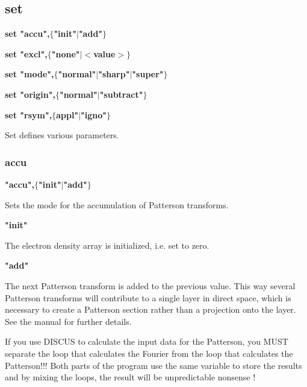 \subsection*{set}
{\bf set "accu",$ \{$"init"$| $"add"$\} $ \par }
{\bf set "excl",$ \{$"none"$| $$ <$value$> $$\} $ \par }
{\bf set "mode",$ \{$"normal"$| $"sharp"$| $"super"$\} $ \par }
{\bf set "origin",$ \{$"normal"$| $"subtract"$\} $ \par }
{\bf set "rsym",$ \{$appl"$| $"igno"$\} $ \par }
\par
\vspace{3pt}
Set defines various parameters. 
\par
\subsubsection{accu}
{\bf "accu",$ \{$"init"$| $"add"$\} $ \par }
\par
\vspace{3pt}
Sets the mode for the accumulation of Patterson transforms. 
\par
{\bf "init" \par }
\vspace{3pt}
The electron density array is initialized, i.e. set to zero. 
\par
{\bf "add" \par }
\vspace{3pt}
The next Patterson transform is added to the previous value.  This way 
several Patterson transforms will contribute to a single layer in direct 
space, which is necessary to create a Patterson section rather than a 
projection onto the layer. See the manual for further details. 
\par
If you use DISCUS to calculate the input data for the Patterson, 
you MUST separate the loop that calculates the Fourier from the loop 
that calculates the Patterson!!! Both parts of the program use 
the same variable to store the results and by mixing the loops, the 
result will be unpredictable nonsense ! 
\par
